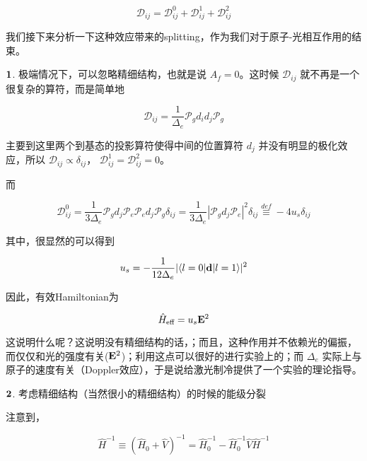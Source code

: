 \begin{equation}
\mathcal{D}_{ij} = \mathcal{D}_{ij}^0 + \mathcal{D}_{ij}^1 + \mathcal{D}_{ij}^2
\end{equation}

我们接下来分析一下这种效应带来的splitting，作为我们对于原子-光相互作用的结束。

{$\bf 1$. } 极端情况下，可以忽略精细结构，也就是说 $A_f = 0$。这时候 $\mathcal{D}_{ij}$ 就不再是一个很复杂的算符，而是简单地

\begin{equation}
\mathcal{D}_{ij} = \frac{1}{\Delta_e}\mathcal{P}_g d_i d_j \mathcal{P}_g
\end{equation}

主要到这里两个到基态的投影算符使得中间的位置算符 $d_j$ 并没有明显的极化效应，所以 $\mathcal{D}_{ij} \propto \delta_{ij}$， $\mathcal{D}_{ij} ^1 = \mathcal{D}_{ij} ^2 = 0$。

而

\begin{equation}
\mathcal{D}_{ij}^0 = \frac{1}{3\Delta_e} \mathcal{P}_g d_j \mathcal{P}_e \mathcal{P}_e d_j \mathcal{P}_g \delta_{ij}= \frac{1}{3\Delta_e} |\mathcal{P}_g d_j \mathcal{P}_e|^2\delta_{ij}\overset{def}{\equiv} -4u_s \delta_{ij}
\end{equation}

其中，很显然的可以得到

\begin{equation}
u_s = -\frac{1}{12\Delta_e} |\langle l=0|{\bf d}|l = 1\rangle|^2
\end{equation}

因此，有效Hamiltonian为

\begin{equation}
\hat{H}_{\text{eff}} = u_s {\bf E}^2
\end{equation}

这说明什么呢？这说明没有精细结构的话，{\color{blue}{光是没有办法改变电子的自旋的（Hamiltonian里面没有包含自旋与其它参数耦合的项）}}；而且，这种作用并不依赖光的偏振，而仅仅和光的强度有关(${\bf E}^2$)；利用这点可以很好的进行实验上的{\color{blue}{光陷阱，从而捕捉原子}}；而 $\Delta_e$ 实际上与原子的速度有关（Doppler效应），于是说给激光制冷提供了一个实验的理论指导。

{$\bf 2$. }考虑精细结构（当然很小的精细结构）的时候的能级分裂

注意到，

\begin{equation}
{\hat H}^{-1} \equiv ({\hat H}_0+\hat{V})^{-1} = {\hat H}_0^{-1} - {\hat H}_0^{-1}\hat{V} {\hat H}^{-1}
\end{equation}

